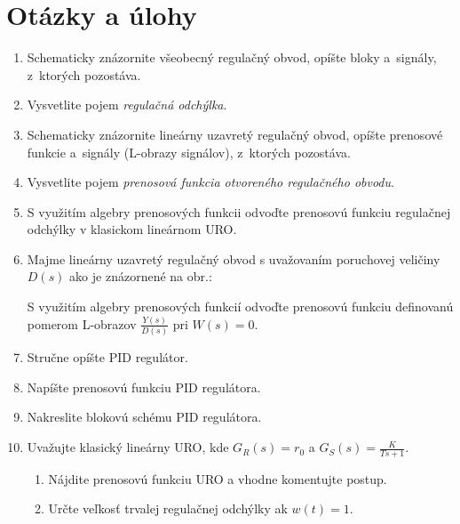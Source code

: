 \documentclass[a4paper, 10pt, ]{article}
\begin{document}
\section{Otázky a úlohy}


\begin{enumerate}[leftmargin=0pt, labelsep=3mm, itemsep=0pt]


    \item Schematicky znázornite všeobecný regulačný obvod, opíšte bloky a~signály, z~ktorých pozostáva.

    \item Vysvetlite pojem \emph{regulačná odchýlka}.

    \item Schematicky znázornite lineárny uzavretý regulačný obvod, opíšte prenosové funkcie a~signály (L-obrazy signálov), z~ktorých pozostáva.

    \item Vysvetlite pojem \emph{prenosová funkcia otvoreného regulačného obvodu}.

    \item S využitím algebry prenosových funkcii odvoďte prenosovú funkciu regulačnej odchýlky v klasickom lineárnom URO.

    \item Majme lineárny uzavretý regulačný obvod s uvažovaním poruchovej veličiny $D(s)$ ako je znázornené na obr.:

    \noindent
    \makebox[\textwidth][c]{%
    
    }

    \noindent
    S využitím algebry prenosových funkcií odvoďte prenosovú funkciu definovanú pomerom L-obrazov $\frac{Y(s)}{D(s)}$ pri $W(s) = 0$.



    \item Stručne opíšte PID regulátor.

    \item Napíšte prenosovú funkciu PID regulátora.

    \item Nakreslite blokovú schému PID regulátora.

    \item Uvažujte klasický lineárny URO, kde $\displaystyle G_R(s) = r_0$ a $\displaystyle G_S(s) = \frac{K}{Ts + 1}$.
    \begin{enumerate}
        \item Nájdite prenosovú funkciu URO a vhodne komentujte postup.
        \item Určte veľkosť trvalej regulačnej odchýlky ak $w(t) = 1$.
    \end{enumerate}


\end{enumerate}
\end{document}
